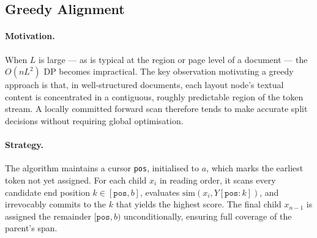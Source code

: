 \documentclass{article}
\theoremstyle{definition}
\begin{document}
\subsection{Greedy Alignment}
\label{sec:greedy}

\paragraph{Motivation.}
When $L$ is large --- as is typical at the region or page level of a document
--- the $O(nL^2)$ DP becomes impractical.  The key observation motivating a
greedy approach is that, in well-structured documents, each layout node's
textual content is concentrated in a contiguous, roughly predictable region
of the token stream.  A locally committed forward scan therefore tends to
make accurate split decisions without requiring global optimisation.

\paragraph{Strategy.}
The algorithm maintains a cursor \texttt{pos}, initialised to $a$, which
marks the earliest token not yet assigned.  For each child $x_i$ in reading
order, it scans every candidate end position $k \in [\texttt{pos}, b]$,
evaluates $\mathrm{sim}(x_i, Y[\texttt{pos}:k])$, and irrevocably commits to
the $k$ that yields the highest score.  The final child $x_{n-1}$ is assigned
the remainder $[\texttt{pos}, b)$ unconditionally, ensuring full coverage of
the parent's span.
\end{document}
